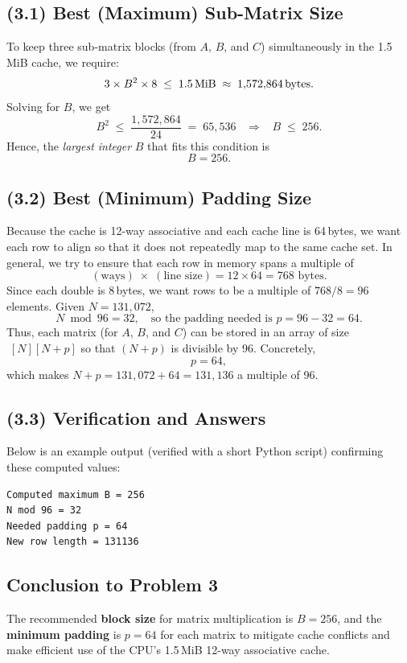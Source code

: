 \documentclass[11pt]{article}
\begin{document}
\subsection*{(3.1) Best (Maximum) Sub-Matrix Size}

To keep three sub-matrix blocks (from $A$, $B$, and $C$) simultaneously in the 1.5\,MiB cache, we require:
\[
3 \times B^2 \times 8 \;\le\; 1.5\,\text{MiB} \;\approx\; 1{,}572{,}864\text{\,bytes}.
\]
Solving for $B$, we get
\[
B^2 \;\le\; \frac{1{,}572{,}864}{24} \;=\; 65{,}536
\;\;\;\Longrightarrow\;\;\;
B \;\le\; 256.
\]
Hence, the \emph{largest integer} $B$ that fits this condition is
\[
\boxed{B = 256}.
\]

\subsection*{(3.2) Best (Minimum) Padding Size}

Because the cache is 12-way associative and each cache line is 64\,bytes, we want each row to align so that it does not repeatedly map to the same cache set. In general, we try to ensure that each row in memory spans a multiple of
\[
(\text{ways}) \;\times\; (\text{line size}) = 12 \times 64 = 768\text{ bytes}.
\]
Since each double is 8\,bytes, we want rows to be a multiple of $768 / 8 = 96$ elements. Given $N = 131{,}072$,
\[
N \bmod 96 = 32,
\quad
\text{so the padding needed is }
p = 96 - 32 = 64.
\]
Thus, each matrix (for $A$, $B$, and $C$) can be stored in an array of size \(\;[N][N + p]\) so that $(N + p)$ is divisible by 96. Concretely,
\[
\boxed{p = 64},
\]
which makes $N + p = 131{,}072 + 64 = 131{,}136$ a multiple of 96.

\subsection*{(3.3) Verification and Answers}

Below is an example output (verified with a short Python script) confirming these computed values:

\begin{verbatim}
Computed maximum B = 256
N mod 96 = 32
Needed padding p = 64
New row length = 131136
\end{verbatim}

\noindent
\subsection*{Conclusion to Problem 3}  
The recommended \textbf{block size} for matrix multiplication is $B = 256$, and the \textbf{minimum padding} is $p = 64$ for each matrix to mitigate cache conflicts and make efficient use of the CPU’s 1.5\,MiB 12-way associative cache. 
\end{document}
